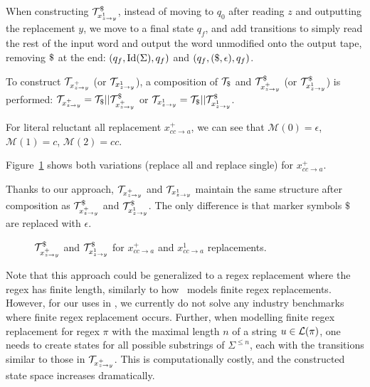 When constructing $\mathcal{T}^\$_{x^{1}_{z \rightarrow y}}$, instead of moving to $q_0$ after reading $z$ and outputting the replacement $y$, we move to a final state $q_f$, and add transitions to simply read the rest of the input word and output the word unmodified onto the output tape, removing $\marker$ at the end: $(q_f, \text{Id}(\Sigma), q_f)$ and $(q_f, (\$, \epsilon), q_f)$.

To construct $\mathcal{T}_{x^{+}_{z \rightarrow y}}$ (or $\mathcal{T}_{x^{1}_{z \rightarrow y}}$), a composition of $\ft_\marker$ and $\mathcal{T}^\$_{x^{+}_{z \rightarrow y}}$ (or $\mathcal{T}^\$_{x^{1}_{z \rightarrow y}}$) is performed: $\mathcal{T}_{x^{+}_{z \rightarrow y}} = \mathcal{T}_\$ || \mathcal{T}^\$_{x^{+}_{z \rightarrow y}}$ or $\mathcal{T}_{x^{1}_{z \rightarrow y}} = \mathcal{T}_\$ || \mathcal{T}^\$_{x^{1}_{z \rightarrow y}}$.

\begin{example}
  For literal reluctant all replacement $x^{+}_{cc  \rightarrow a}$, we can see that $\mathcal{M}(0) = \epsilon$, $\mathcal{M}(1) = c$, $\mathcal{M}(2) = cc$.

  Figure~\ref{fig:literal_reluctant_replace} shows both variations (replace all and replace single) \nfts for $x^{+}_{cc \rightarrow a}$.

  Thanks to our approach, $\mathcal{T}_{x^{+}_{z \rightarrow y}}$ and $\mathcal{T}_{x^{1}_{z \rightarrow y}}$ maintain the same structure after composition as $\mathcal{T}^\$_{x^{+}_{z \rightarrow y}}$ and $\mathcal{T}^\$_{x^{1}_{z \rightarrow y}}$.
  The only difference is that marker symbols $\$$ are replaced with $\epsilon$.

\begin{figure}[ht]
    \centering
    \quad
    \caption{
      $\mathcal{T}^\$_{x^{+}_{z \rightarrow y}}$ and $\mathcal{T}^\$_{x^{1}_{z \rightarrow y}}$ for $x^{+}_{cc \rightarrow a}$ and $x^{1}_{cc \rightarrow a}$ replacements.
    }
    \label{fig:literal_reluctant_replace}%
\end{figure}

\end{example}

Note that this approach could be generalized to a regex replacement where the regex has finite length, similarly to how~\cite{replace_nfts_model_ModelingRegularReplacementForStringConstraintSolving_DBLP:conf/nfm/FuL10} models finite regex replacements.
However, for our uses in \noodler, we currently do not solve any industry benchmarks where finite regex replacement occurs.
Further, when modelling finite regex replacement for regex $\pi$ with the maximal length $n$ of a string $u \in \mathcal{L}(\pi)$, one needs to create states for all possible substrings of $\Sigma^{\leq n}$, each with the transitions similar to those in $\mathcal{T}_{x^{+}_{z \rightarrow y}}$.
This is computationally costly, and the constructed state space increases dramatically.

